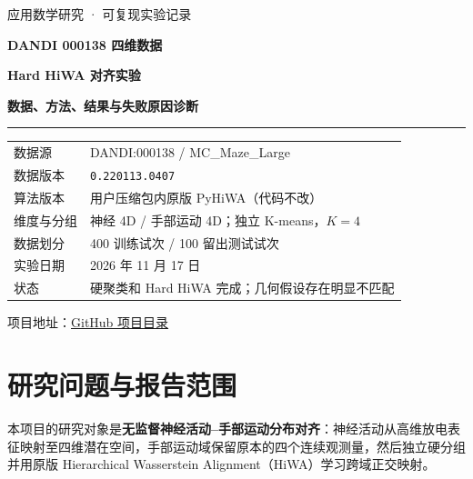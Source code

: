 \documentclass[UTF8,zihao=-4,a4paper]{ctexart}
\newcommand{\repo}{\href{https://github.com/noelabernathy400-bot/ot-hiwa/tree/main/projects/dandi-000138-hiwa-4d}{GitHub 项目目录}}
\begin{document}
\begin{titlepage}
\thispagestyle{empty}
\vspace*{2.2cm}
{\sffamily\color{accent}\Large 应用数学研究 · 可复现实验记录\par}
\vspace{0.65cm}
{\Huge\bfseries\color{ink}DANDI 000138 四维数据\par}
\vspace{0.22cm}
{\Huge\bfseries\color{ink}Hard HiWA 对齐实验\par}
\vspace{0.22cm}
{\LARGE\bfseries\color{accent}数据、方法、结果与失败原因诊断\par}
\vspace{1.2cm}
{\noindent\color{soft}\rule{\linewidth}{1pt}\par}
\vspace{0.65cm}
\begin{tabular}{@{}ll@{}}
数据源 & DANDI:000138 / MC\_Maze\_Large \\
数据版本 & \texttt{0.220113.0407} \\
算法版本 & 用户压缩包内原版 PyHiWA（代码不改） \\
维度与分组 & 神经 4D / 手部运动 4D；独立 K-means，$K=4$ \\
数据划分 & 400 训练试次 / 100 留出测试试次 \\
实验日期 & 2026 年 11 月 17 日 \\
状态 & 硬聚类和 Hard HiWA 完成；几何假设存在明显不匹配 \\
\end{tabular}
\vfill
\noindent{}
\vspace{0.7cm}
{\small\color{soft}项目地址：\repo\par}
\end{titlepage}

\tableofcontents
\newpage
\section{研究问题与报告范围}
本项目的研究对象是\textbf{无监督神经活动--手部运动分布对齐}：神经活动从高维放电表征映射至四维潜在空间，手部运动域保留原本的四个连续观测量，然后独立硬分组并用原版 Hierarchical Wasserstein Alignment（HiWA）学习跨域正交映射。
\end{document}
